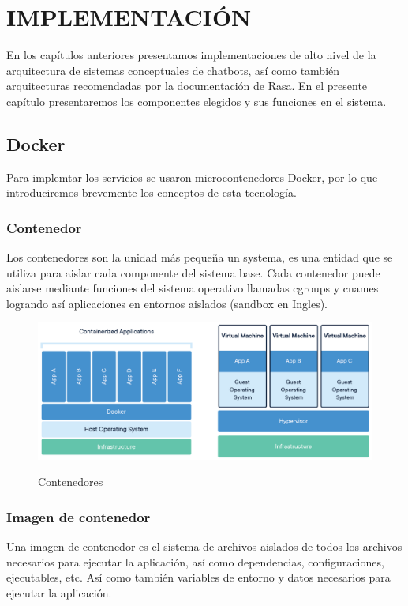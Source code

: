 \chapter[IMPLEMENTACION]{IMPLEMENTACIÓN}
En los capítulos anteriores presentamos implementaciones de alto nivel de la arquitectura de
sistemas conceptuales de chatbots, así como también arquitecturas recomendadas por la documentación
de Rasa. En el presente capítulo presentaremos los componentes elegidos y sus funciones en el
sistema.

\section{Docker}

Para implemtar los servicios se usaron microcontenedores Docker, por lo que introduciremos
brevemente los conceptos de esta tecnología.

\subsection{Contenedor}

Los contenedores son la unidad más pequeña un systema, es una entidad que se utiliza para aislar
cada componente del sistema base. Cada contenedor puede aislarse mediante funciones del sistema
operativo llamadas cgroups y cnames logrando así aplicaciones en entornos aislados (sandbox en
Ingles). \cite{Docker}

\begin{figure}[ht]
	\centering
	\includegraphics[width=\textwidth]{imagenes/cap4/docker-container.png}
	\caption{Contenedores}
  \cite{Docker}
	\label{fig:container_diagram}
\end{figure}

\subsection{Imagen de contenedor}

Una imagen de contenedor es el sistema de archivos aislados de todos los archivos necesarios para
ejecutar la aplicación, así como dependencias, configuraciones, ejecutables, etc. Así como también
variables de entorno y datos necesarios para ejecutar la aplicación. \cite{Docker}

